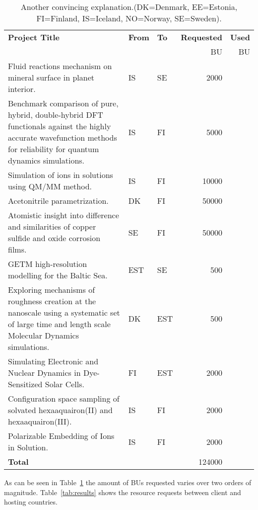 \begin{table}
\begin{center}
\begin{tabular}{|p{7cm}|l|l|r|r|} \hline
\bf Project Title & \bf From & \bf To &\bf Requested &\bf Used \\
                  & & & BU & BU \\\hline
Fluid reactions mechanism on mineral surface in planet interior. & IS & SE & 2000 &  \\
Benchmark comparison of pure, hybrid, double-hybrid DFT functionals against the highly accurate wavefunction methods for reliability for quantum dynamics simulations. & IS & FI & 5000 & \\
Simulation of ions in solutions using QM/MM method. & IS & FI & 10000 & \\
Acetonitrile parametrization. & DK & FI & 50000 & \\
Atomistic insight into difference and similarities of copper sulfide and oxide corrosion films. & SE & FI & 50000 & \\
GETM high-resolution modelling for the Baltic Sea. & EST & SE & 500 & \\
Exploring mechanisms of roughness creation at the nanoscale using a systematic set of large time and length scale Molecular Dynamics simulations. & DK & EST & 500 & \\
Simulating Electronic and Nuclear Dynamics in Dye-Sensitized Solar Cells. & FI & EST & 2000 & \\
Configuration space sampling of solvated hexaaquairon(II) and hexaaquairon(III). & IS & FI & 2000 & \\
Polarizable Embedding of Ions in Solution. & IS & FI & 2000 & \\
\bf Total & & & 124000 & \\\hline
\end{tabular}
\caption{Another convincing explanation.(DK=Denmark, EE=Estonia, FI=Finland, IS=Iceland, NO=Norway, SE=Sweden). \label{tab:projects}}
\end{center}
\end{table}
As can be seen in Table~\ref{tab:projects} the amount of BUs requested varies over two orders of magnitude.
Table~\ref{tab:results} shows the resource requests between client and hosting countries.
